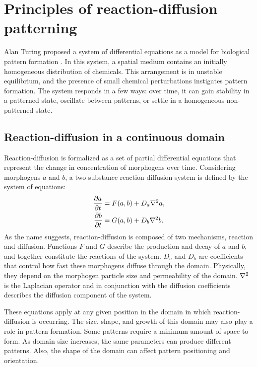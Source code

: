 \chapter{Principles of reaction-diffusion patterning} 
Alan Turing proposed a system of differential equations as a model for biological pattern formation \citep{turing1952}. In this system, a spatial medium contains an initially homogeneous distribution of chemicals. This arrangement is in unstable equilibrium, and the presence of small chemical perturbations instigates pattern formation. The system responds in a few ways: over time, it can gain stability in a patterned state, oscillate between patterns, or settle in a homogeneous non-patterned state. 

\section{Reaction-diffusion in a continuous domain}
Reaction-diffusion is formalized as a set of partial differential equations that represent the change in concentration of morphogens over time. Considering morphogens $a$ and $b$, a two-substance reaction-diffusion system is defined by the system of equations:
	\begin{equation}
	\begin{aligned} \label{eq:basicRD}
		\frac{\partial a}{\partial t} &= F(a, b) + D_a \nabla^2 a,\\
		\frac{\partial b}{\partial t} &= G(a, b) + D_b \nabla^2 b.
	\end{aligned}
	\end{equation}
As the name suggests, reaction-diffusion is composed of two mechanisms, reaction and diffusion. Functions $F$ and $G$ describe the production and decay of $a$ and $b$, and together constitute the reactions of the system. $D_a$ and $D_b$ are coefficients that control how fast these morphogens diffuse through the domain. Physically, they depend on the morphogen particle size and permeability of the domain. $\nabla^2{}$ is the Laplacian operator and in conjunction with the diffusion coefficients describes the diffusion component of the system.

These equations apply at any given position in the domain in which reaction-diffusion is occurring. The size, shape, and growth of this domain may also play a role in pattern formation. Some patterns require a minimum amount of space to form. As domain size increases, the same parameters can produce different patterns. Also, the shape of the domain can affect pattern positioning and orientation.

